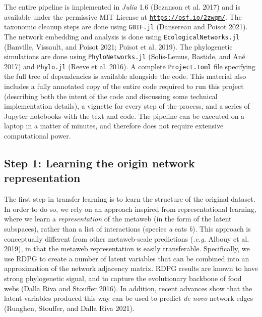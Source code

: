 \documentclass[11pt]{article}
\begin{document}
The entire pipeline is implemented in \emph{Julia} 1.6 (Bezanson et al.
2017) and is available under the permissive MIT License at
\href{https://osf.io/2zwqm/}{\texttt{https://osf.io/2zwqm/}}. The
taxonomic cleanup steps are done using \texttt{GBIF.jl} (Dansereau and
Poisot 2021). The network embedding and analysis is done using
\texttt{EcologicalNetworks.jl} (Banville, Vissault, and Poisot 2021;
Poisot et al. 2019). The phylogenetic simulations are done using
\texttt{PhyloNetworks.jl} (Solís-Lemus, Bastide, and Ané 2017) and
\texttt{Phylo.jl} (Reeve et al. 2016). A complete \texttt{Project.toml}
file specifying the full tree of dependencies is available alongside the
code. This material also includes a fully annotated copy of the entire
code required to run this project (describing both the intent of the
code and discussing some technical implementation details), a vignette
for every step of the process, and a series of Jupyter notebooks with
the text and code. The pipeline can be executed on a laptop in a matter
of minutes, and therefore does not require extensive computational
power.

\hypertarget{step-1-learning-the-origin-network-representation}{%
\subsection{Step 1: Learning the origin network
representation}\label{step-1-learning-the-origin-network-representation}}

The first step in transfer learning is to learn the structure of the
original dataset. In order to do so, we rely on an approach inspired
from representational learning, where we learn a \emph{representation}
of the metaweb (in the form of the latent subspaces), rather than a list
of interactions (species \emph{a} eats \emph{b}). This approach is
conceptually different from other metaweb-scale predictions
(\emph{.e.g.} Albouy et al. 2019), in that the metaweb representation is
easily transferable. Specifically, we use RDPG to create a number of
latent variables that can be combined into an approximation of the
network adjacency matrix. RDPG results are known to have strong
phylogenetic signal, and to capture the evolutionary backbone of food
webs (Dalla Riva and Stouffer 2016). In addition, recent advances show
that the latent variables produced this way can be used to predict
\emph{de novo} network edges (Runghen, Stouffer, and Dalla Riva 2021).
\end{document}
